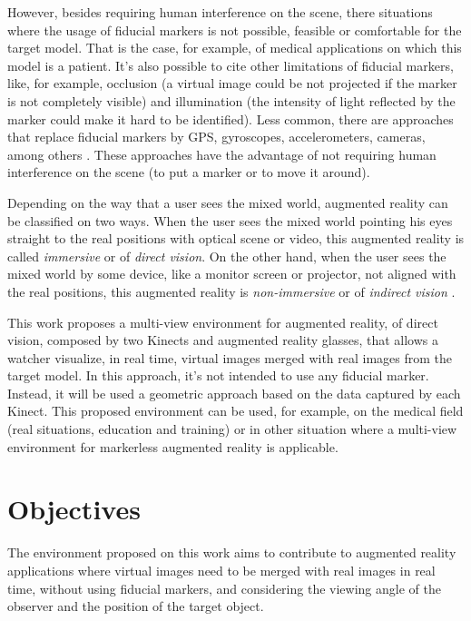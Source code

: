 \documentclass[msc, a4paper, classic, en]{ufbathesis}
\begin{document}
However, besides requiring human interference on the scene, there situations where the usage of fiducial markers is not possible, feasible or comfortable for the target model. That is the case, for example, of medical applications on which this model is a patient. It's also possible to cite other limitations of fiducial markers, like, for example, occlusion (a virtual image could be not projected if the marker is not completely visible) and illumination (the intensity of light reflected by the marker could make it hard to be identified). Less common, there are approaches that replace fiducial markers \cite{carmigniani} \cite{gallo09} by GPS, gyroscopes, accelerometers, cameras, among others \cite{azuma} \cite{azuma01}. These approaches have the advantage of not requiring human interference on the scene (to put a marker or to move it around).

Depending on the way that a user sees the mixed world, augmented reality can be classified on two ways. When the user sees the mixed world pointing his eyes straight to the real positions with optical scene or video, this augmented reality is called \textit{immersive} or of \textit{direct vision}. On the other hand, when the user sees the mixed world by some device, like a monitor screen or projector, not aligned with the real positions, this augmented reality is \textit{non-immersive} or of \textit{indirect vision} \cite{tori2006fundamentos}.

This work proposes a multi-view environment for augmented reality, of direct vision, composed by two Kinects \cite{kinect} and augmented reality glasses, that allows a watcher visualize, in real time, virtual images merged with real images from the target model. In this approach, it's not intended to use any fiducial marker. Instead, it will be used a geometric approach based on the data captured by each Kinect. This proposed environment can be used, for example, on the medical field (real situations, education and training) or in other situation where a multi-view environment for markerless augmented reality is applicable. 

\section{Objectives}

The environment proposed on this work aims to contribute to augmented reality applications where virtual images need to be merged with real images in real time, without using fiducial markers, and considering the viewing angle of the observer and the position of the target object.
\end{document}
